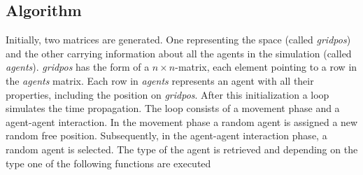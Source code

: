 \documentclass[11pt]{article}
\begin{document}
\subsection{Algorithm}
Initially, two matrices are generated. One representing the space (called \textit{gridpos}) and the other carrying information about all the agents in the simulation (called \textit{agents}). \textit{gridpos} has the form of a $n\times n$-matrix, each element pointing to a row in the \textit{agents} matrix. Each row in \textit{agents}  represents an agent with all their properties, including the position on \textit{gridpos}. After this initialization a loop simulates the time propagation. The loop consists of a movement phase and a agent-agent interaction. In the movement phase a random agent is assigned a new random free position. Subsequently, in the agent-agent interaction phase, a random agent is selected. The type of the agent is retrieved and depending on the type one of the following functions are executed
\end{document}
